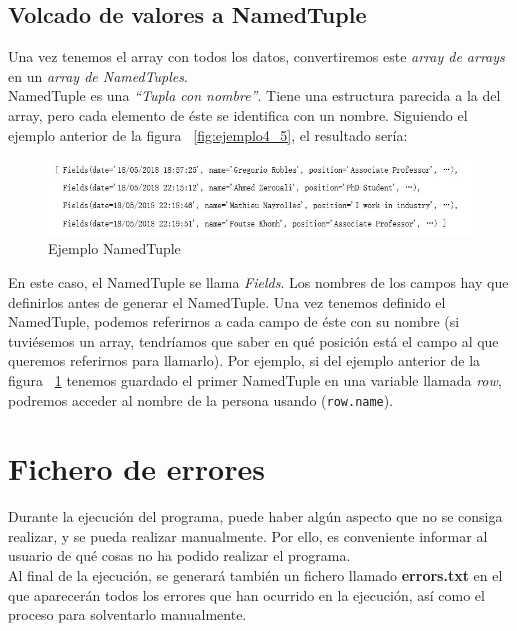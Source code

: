 \documentclass[a4paper, 12pt]{book}
\begin{document}
\subsection{Volcado de valores a NamedTuple}
\label{subsec:namedtuple}
Una vez tenemos el array con todos los datos, convertiremos este \textit{array de arrays} en un \textit{array de NamedTuples}.\\

NamedTuple es una \textit{``Tupla con nombre''}. Tiene una estructura parecida a la del array, pero cada elemento de éste se identifica con un nombre. Siguiendo el ejemplo anterior de la figura ~\ref{fig:ejemplo4_5}, el resultado sería:\\

\begin{figure}[h!]
	\centering
	\includegraphics[width=17cm, keepaspectratio]{img/ejemplo45real2}
	\caption{Ejemplo NamedTuple}
	\label{fig:ejemplo4_5Namedtuple}
\end{figure}


En este caso, el NamedTuple se llama \textit{Fields}. Los nombres de los campos hay que definirlos antes de generar el NamedTuple. Una vez tenemos definido el NamedTuple, podemos referirnos a cada campo de éste con su nombre (si tuviésemos un array, tendríamos que saber en qué posición está el campo al que queremos referirnos para llamarlo). Por ejemplo, si del ejemplo anterior de la figura ~\ref{fig:ejemplo4_5Namedtuple} tenemos guardado el primer NamedTuple en una variable llamada \textit{row}, podremos acceder al nombre de la persona usando (\verb"row.name").

\section{Fichero de errores}
\label{sec:errores}
Durante la ejecución del programa, puede haber algún aspecto que no se consiga realizar, y se pueda realizar manualmente. Por ello, es conveniente informar al usuario de qué cosas no ha podido realizar el programa.\\

Al final de la ejecución, se generará también un fichero llamado \textbf{errors.txt} en el que aparecerán todos los errores que han ocurrido en la ejecución, así como el proceso para solventarlo manualmente.\\
\end{document}
